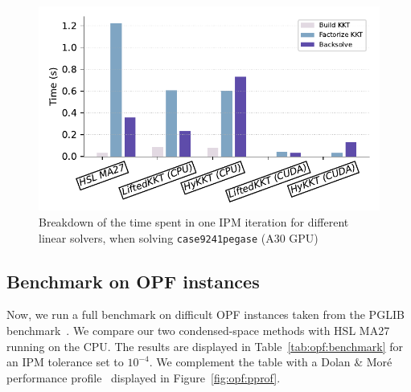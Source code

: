 \begin{figure}[!ht]
  \centering
  \includegraphics[width=.7\textwidth]{../figures/breakdown.pdf}
  \caption{Breakdown of the time spent in one IPM iteration
    for different linear solvers, when solving {\tt case9241pegase} (A30 GPU)
  \label{fig:timebreakdown}}
\end{figure}



\subsection{Benchmark on OPF instances}
Now, we run a full benchmark on difficult OPF instances taken
from the PGLIB benchmark~\cite{babaeinejadsarookolaee2019power}.
We compare our two condensed-space methods with HSL MA27 running
on the CPU. The results are displayed in Table~\ref{tab:opf:benchmark}
for an IPM tolerance set to $10^{-4}$.
We complement the table with a Dolan \& Moré performance profile~\cite{dolan2002benchmarking} displayed
in Figure~\ref{fig:opf:pprof}.

